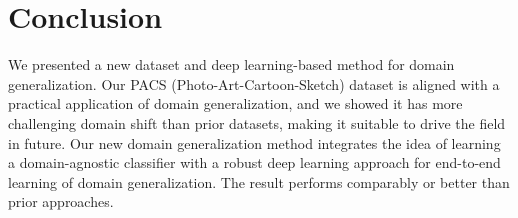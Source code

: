 \documentclass[10pt,twocolumn,letterpaper]{article}
\begin{document}
\section{Conclusion} We presented a new dataset and deep learning-based method for domain generalization. Our PACS (Photo-Art-Cartoon-Sketch) dataset is aligned with a practical application of domain generalization, and we showed it has more challenging domain shift than prior datasets, making it suitable to drive the field in future. Our new domain generalization method integrates the idea of learning a domain-agnostic classifier with a robust deep learning approach for end-to-end learning of domain generalization. The result performs comparably or better than prior approaches.
\end{document}
